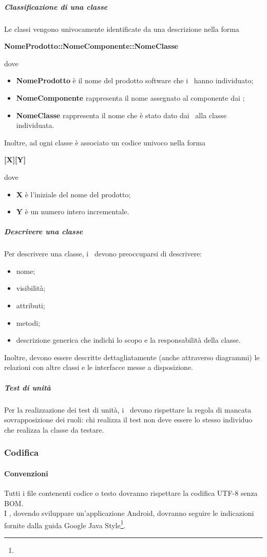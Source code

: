 \documentclass[../NormeProgetto.tex]{subfiles}
\begin{document}
			\subparagraph{Classificazione di una classe}
				Le classi vengono univocamente identificate da una descrizione nella forma \begin{center}
				\textbf{NomeProdotto::NomeComponente::NomeClasse}
				\end{center} dove
				\begin{itemize}
					\item \textbf{NomeProdotto} è il nome del prodotto software che i \progettisti\ hanno individuato;
					\item \textbf{NomeComponente} rappresenta il nome assegnato al componente dai \progettisti;
					\item \textbf{NomeClasse} rappresenta il nome che è stato dato dai \progettisti\ alla classe individuata.
				\end{itemize}
				Inoltre, ad ogni classe è associato un codice univoco nella forma \begin{center}
				\textbf{[X][Y]}
				\end{center} dove
				\begin{itemize}
					\item \textbf{X} è l'iniziale del nome del prodotto;
					\item \textbf{Y} è un numero intero incrementale.
				\end{itemize}
			\subparagraph{Descrivere una classe}			
				Per descrivere una classe, i \progettisti\ devono preoccuparsi di descrivere:
				\begin{itemize}
					\item nome;
					\item visibilità;
					\item attributi;
					\item metodi;
					\item descrizione generica che indichi lo scopo e la responsabilità della classe.
				\end{itemize}
				Inoltre, devono essere descritte dettagliatamente (anche attraverso diagrammi) le relazioni con altre classi e le interfacce messe a disposizione.
			\subparagraph{Test di unità}
				Per la realizzazione dei test di unità, i \programmatori\ devono rispettare la regola di mancata sovrapposizione dei ruoli: chi realizza il test non deve essere lo stesso individuo che realizza la classe da testare.
		\subsubsection{Codifica}
			\paragraph{Convenzioni}
				Tutti i file contenenti codice o testo dovranno rispettare la codifica UTF-8 senza BOM.\\
				I \programmatori, dovendo sviluppare un'applicazione Android, dovranno seguire le indicazioni fornite dalla guida Google Java Style\footnote{}.
\end{document}
